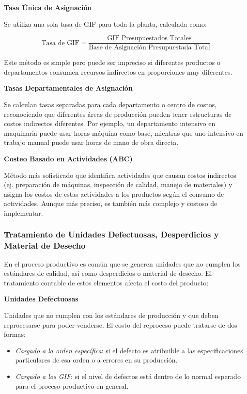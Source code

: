 \documentclass[
  stu,
  floatsintext,
  longtable,
  a4paper,
  nolmodern,
  notxfonts,
  notimes,
  12pt,
  colorlinks=true,linkcolor=blue,citecolor=blue,urlcolor=blue]{apa7}
\providecommand{\tightlist}{%
  \setlength{\itemsep}{0pt}\setlength{\parskip}{0pt}}
\begin{document}
\textbf{Tasa Única de Asignación}

Se utiliza una sola tasa de GIF para toda la planta, calculada como:

\[
\text{Tasa de GIF} = \frac{\text{GIF Presupuestados Totales}}{\text{Base de Asignación Presupuestada Total}}
\]

Este método es simple pero puede ser impreciso si diferentes productos o
departamentos consumen recursos indirectos en proporciones muy
diferentes.

\textbf{Tasas Departamentales de Asignación}

Se calculan tasas separadas para cada departamento o centro de costos,
reconociendo que diferentes áreas de producción pueden tener estructuras
de costos indirectos diferentes. Por ejemplo, un departamento intensivo
en maquinaria puede usar horas-máquina como base, mientras que uno
intensivo en trabajo manual puede usar horas de mano de obra directa.

\textbf{Costeo Basado en Actividades (ABC)}

Método más sofisticado que identifica actividades que causan costos
indirectos (ej. preparación de máquinas, inspección de calidad, manejo
de materiales) y asigna los costos de estas actividades a los productos
según el consumo de actividades. Aunque más preciso, es también más
complejo y costoso de implementar.

\subsubsection{Tratamiento de Unidades Defectuosas, Desperdicios y
Material de
Desecho}\label{tratamiento-de-unidades-defectuosas-desperdicios-y-material-de-desecho}

En el proceso productivo es común que se generen unidades que no cumplen
los estándares de calidad, así como desperdicios o material de desecho.
El tratamiento contable de estos elementos afecta el costo del producto:

\textbf{Unidades Defectuosas}

Unidades que no cumplen con los estándares de producción y que deben
reprocesarse para poder venderse. El costo del reproceso puede tratarse
de dos formas:

\begin{itemize}
\tightlist
\item
  \emph{Cargado a la orden específica}: si el defecto es atribuible a
  las especificaciones particulares de esa orden o a errores en su
  producción.
\item
  \emph{Cargado a los GIF}: si el nivel de defectos está dentro de lo
  normal esperado para el proceso productivo en general.
\end{itemize}
\end{document}
